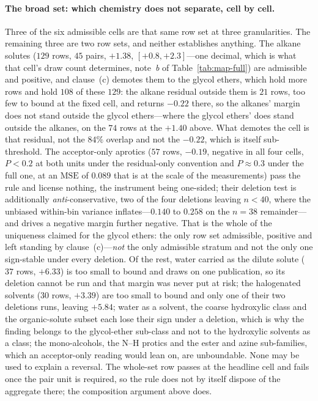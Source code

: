 \paragraph{The broad set: which chemistry does not separate, cell by cell.} Three of the six admissible cells are that same row set at
three granularities. The remaining three are two row sets, and neither establishes anything. The
alkane solutes ($129$ rows, $45$ pairs, $+1.38$, $[+0.8,+2.3]$---one decimal, which is what that
cell's draw count determines, note~\emph{b} of Table~\ref{tab:map-full}) are admissible and positive, and
clause~(c) demotes them to the glycol ethers, which hold more rows and hold $108$ of these $129$:
the alkane residual outside them is $21$ rows, too few to bound at the fixed cell, and returns
$-0.22$ there, so the alkanes' margin does not stand outside the glycol ethers---where the glycol
ethers' does stand outside the alkanes, on the $74$ rows at the $+1.40$ above. What demotes the cell
is that residual, not the $84\%$ overlap and not the $-0.22$, which is itself
sub-threshold. The acceptor-only aprotics ($57$ rows, $-0.19$, negative in
all four cells, $P<0.2$ at both units under the residual-only convention and $P\approx0.3$ under the full
one, at an $\mathrm{MSE}$ of $0.089$ that is at the scale of the measurements) pass the rule and
license nothing, the instrument being one-sided; their deletion test is additionally
\emph{anti}-conservative, two of the four deletions leaving $n<40$, where the unbiased within-bin
variance inflates---$0.140$ to $0.258$ on the $n{=}38$ remainder---and drives a negative margin
further negative. That is the whole of the uniqueness claimed for the glycol ethers: the only row set
admissible, positive and left standing by clause~(c)---\emph{not} the only admissible stratum and not
the only one sign-stable under every deletion. Of the rest, water carried as the dilute solute ($37$
rows, $+6.33$) is too small to bound and draws on one publication, so its deletion cannot be run and
that margin was never put at risk; the halogenated solvents ($30$ rows, $+3.39$) are too small to
bound and only one of their two deletions runs, leaving $+5.84$;
water as a solvent, the coarse hydroxylic class and the organic-solute subset each lose their sign
under a deletion, which is why the finding belongs to the glycol-ether sub-class and not to the
hydroxylic solvents as a class; the mono-alcohols, the N--H protics and the ester and azine
sub-families, which an acceptor-only reading would lean on, are unboundable. None may be used to
explain a reversal. The whole-set row passes at the headline cell
and fails once the pair unit is required, so the rule does not by itself dispose of the aggregate
there; the composition argument above does.

